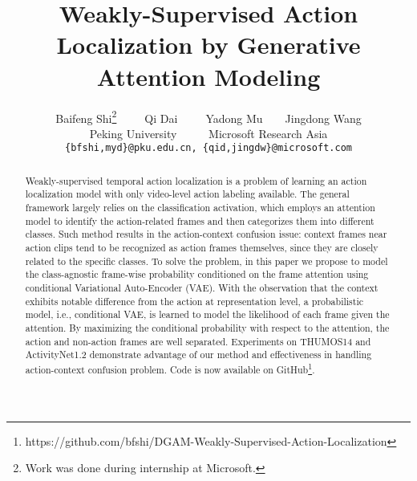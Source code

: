 \documentclass[10pt,twocolumn,letterpaper]{article}
\begin{document}
\title{Weakly-Supervised Action Localization
by Generative Attention Modeling}

\author{Baifeng Shi\thanks{Work was done during internship at Microsoft.}~~~~~Qi Dai~~~~~Yadong Mu~~~~Jingdong Wang\\
  Peking University~~~~~
  Microsoft Research Asia\\
  {\tt\small \{bfshi,myd\}@pku.edu.cn, \{qid,jingdw\}@microsoft.com}
}

\maketitle

\begin{abstract}
Weakly-supervised temporal action localization is a problem of learning an action localization model with only video-level action labeling available.
The general framework largely relies on the classification activation, which employs an attention model to identify the action-related frames and then categorizes them into different classes.
Such method results in the action-context confusion issue: context frames near action clips tend to be recognized as action frames themselves, since they are closely related to the specific classes.
To solve the problem, in this paper we propose to model the class-agnostic frame-wise probability conditioned on the frame attention using conditional Variational Auto-Encoder (VAE).
With the observation that the context exhibits notable difference from the action at representation level, a probabilistic model, i.e., conditional VAE, is learned to model the likelihood of each frame given the attention.
By maximizing the conditional probability with respect to the attention, the action and non-action frames are well separated.
Experiments on THUMOS14 and ActivityNet1.2 demonstrate advantage of our method and effectiveness in handling action-context confusion problem. Code is now available on GitHub\footnote{https://github.com/bfshi/DGAM-Weakly-Supervised-Action-Localization}.






\end{abstract}
\end{document}
